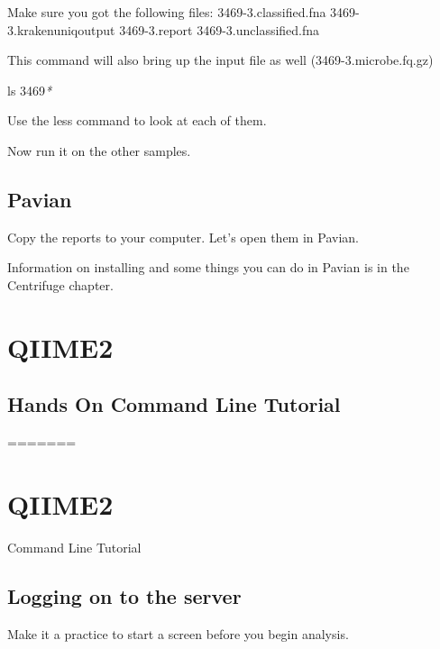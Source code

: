 \documentclass[
]{book}
\newenvironment{Shaded}{\begin{snugshade}}{\end{snugshade}}
\newcommand{\FunctionTok}[1]{\textcolor[rgb]{0.00,0.00,0.00}{#1}}
\newcommand{\NormalTok}[1]{#1}
\newcommand{\PreprocessorTok}[1]{\textcolor[rgb]{0.56,0.35,0.01}{\textit{#1}}}
\begin{document}
Make sure you got the following files:
3469-3.classified.fna
3469-3.krakenuniqoutput
3469-3.report
3469-3.unclassified.fna

This command will also bring up the input file as well (3469-3.microbe.fq.gz)

\begin{Shaded}
\begin{Highlighting}[]
\FunctionTok{ls}\NormalTok{ 3469}\PreprocessorTok{*}
\end{Highlighting}
\end{Shaded}

Use the less command to look at each of them.

Now run it on the other samples.

\hypertarget{pavian}{%
\section{Pavian}\label{pavian}}

Copy the reports to your computer.
Let's open them in Pavian.

Information on installing and some things you can do in Pavian is in the Centrifuge chapter.

\hypertarget{qiime2}{%
\chapter{QIIME2}\label{qiime2}}

\hypertarget{hands-on-command-line-tutorial}{%
\section{Hands On Command Line Tutorial}\label{hands-on-command-line-tutorial}}

=======

\hypertarget{qiime2-1}{%
\chapter{QIIME2}\label{qiime2-1}}

Command Line Tutorial

\hypertarget{logging-on-to-the-server}{%
\section{Logging on to the server}\label{logging-on-to-the-server}}

Make it a practice to start a screen before you begin analysis.
\end{document}
